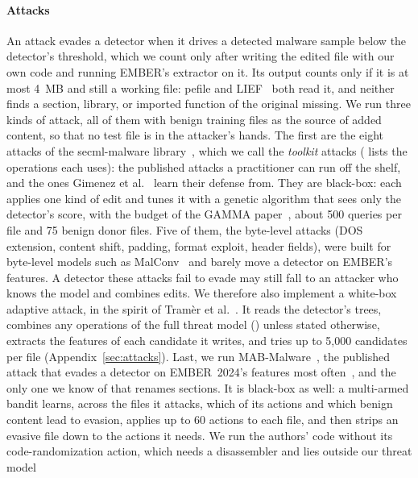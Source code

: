\paragraph{Attacks}
An attack evades a detector when it drives a detected malware sample below the detector's threshold, which we count
only after writing the edited file with our own code and running EMBER's extractor on it. Its output counts
only if it is at most 4~MB and still a working file: pefile and LIEF~\cite{lief} both read it, and neither finds a
section, library, or imported function of the original missing. We
run three kinds of attack, all of them with benign training files as the source of added content, so that no test file
is in the attacker's hands. The first are the eight attacks of the secml-malware
library~\cite{demetrio2021adversarial}, which we call the \emph{toolkit} attacks ( lists
the operations each uses): the published attacks a practitioner can run off the shelf, and the ones Gimenez et
al.~\cite{gimenez2025certifiably} learn their defense from. They are black-box: each applies one kind of edit and tunes
it with a genetic algorithm that sees only the detector's score, with the budget of the GAMMA
paper~\cite{demetrio2021functionality}, about 500 queries per file and 75 benign donor files. Five of them, the
byte-level attacks (DOS extension, content shift, padding, format exploit, header fields), were built for byte-level
models such as MalConv~\cite{raff2018malware} and barely move a detector on EMBER's features. A detector these attacks fail
to evade may still fall to an attacker who knows the model and combines edits. We therefore also implement a white-box
adaptive attack, in the spirit of Tramèr et al.~\cite{tramer2020adaptive}. It reads the detector's trees,
combines any operations of the full threat model () unless stated otherwise, extracts the
features of each candidate it writes, and tries up to 5,000 candidates per file (Appendix~\ref{sec:attacks}). Last, we
run MAB-Malware~\cite{song2022mab}, the published attack that evades a detector on EMBER~2024's features most
often~\cite{zainab2026breaking}, and the only one we know of that renames sections. It is black-box as well: a
multi-armed bandit learns, across the files it attacks, which of its actions and which benign content lead to evasion,
applies up to 60 actions to each file, and then strips an evasive file down to the actions it needs. We run the
authors' code without its code-randomization action, which needs a disassembler and lies outside our threat model
